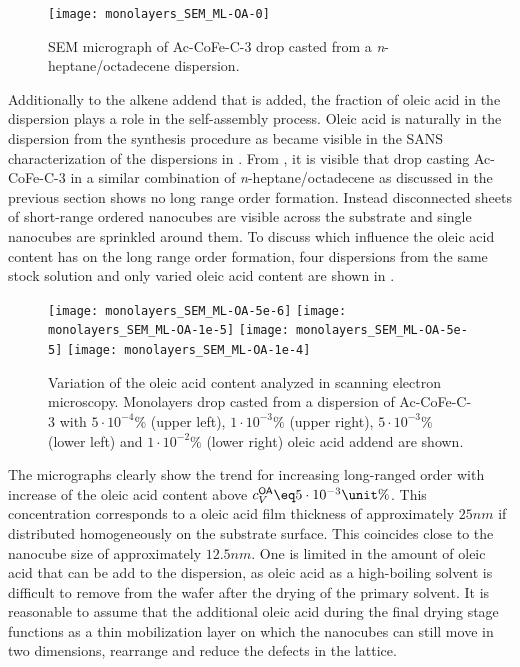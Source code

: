 \documentclass[\main/dresen_thesis.tex]{subfiles}
\begin{document}
  \begin{figure}[!htbp]
    \centering
    \texttt{[image: monolayers\_SEM\_ML-OA-0]}
    \caption{\label{fig:monolayers:preparation:solventVariation:NoOAAddend}SEM micrograph of Ac-CoFe-C-3 drop casted from a \textit{n}-heptane/octadecene dispersion.}
  \end{figure}

  Additionally to the alkene addend that is added, the fraction of oleic acid in the dispersion plays a role in the self-assembly process.
  Oleic acid is naturally in the dispersion from the synthesis procedure as became visible in the SANS characterization of the dispersions in .
  From , it is visible that drop casting Ac-CoFe-C-3 in a similar combination of \textit{n}-heptane/octadecene as discussed in the previous section shows no long range order formation.
  Instead disconnected sheets of short-range ordered nanocubes are visible across the substrate and single nanocubes are sprinkled around them.
  To discuss which influence the oleic acid content has on the long range order formation, four dispersions from the same stock solution and only varied oleic acid content are shown in .

  \begin{figure}[tb]
    \centering
    \texttt{[image: monolayers\_SEM\_ML-OA-5e-6]}
    \texttt{[image: monolayers\_SEM\_ML-OA-1e-5]}
    \texttt{[image: monolayers\_SEM\_ML-OA-5e-5]}
    \texttt{[image: monolayers\_SEM\_ML-OA-1e-4]}
    \caption{\label{fig:monolayers:preparation:solventVariation:OAAddend}Variation of the oleic acid content analyzed in scanning electron microscopy. Monolayers drop casted from a dispersion of Ac-CoFe-C-3 with $5\cdot10^{-4} \unit{\%}$ (upper left), $1\cdot10^{-3} \unit{\%}$ (upper right), $5\cdot10^{-3} \unit{\%}$ (lower left) and $1\cdot10^{-2} \unit{\%}$ (lower right) oleic acid addend are shown.}
  \end{figure}

  The micrographs clearly show the trend for increasing long-ranged order with increase of the oleic acid content above $c_V^\textsf{OA} \eq 5\cdot10^{-3} \unit{\%}$.
  This concentration corresponds to a oleic acid film thickness of approximately $25 \unit{nm}$ if distributed homogeneously on the substrate surface.
  This coincides close to the nanocube size of approximately $12.5 \unit{nm}$.
  One is limited in the amount of oleic acid that can be add to the dispersion, as oleic acid as a high-boiling solvent is difficult to remove from the wafer after the drying of the primary solvent.
  It is reasonable to assume that the additional oleic acid during the final drying stage functions as a thin mobilization layer on which the nanocubes can still move in two dimensions, rearrange and reduce the defects in the lattice.
\end{document}
